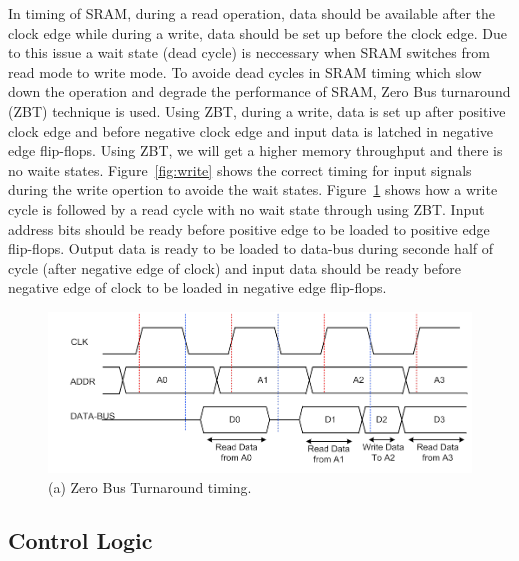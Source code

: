 In timing of SRAM, during a read operation, data should be available after the clock edge while 
during a write, data should be set up before the clock edge. Due to this issue a wait state (dead cycle) is neccessary when SRAM switches 
from read mode to write mode. 
To avoide dead cycles in SRAM timing which slow down the operation and degrade the performance of SRAM, Zero Bus turnaround (ZBT) technique is used.
Using ZBT, during a write, data is set up after positive clock edge and before negative clock edge and input data is latched in negative edge flip-flops. 
Using ZBT, we will get a higher memory throughput and there is no waite states.
Figure~\ref{fig:write} shows the correct timing for input signals during the write opertion to avoide the wait states. 
Figure~\ref{fig:ZBT} shows how a write cycle is followed by a read cycle with no wait state through using ZBT.
Input address bits should be ready before positive edge to be loaded to positive edge flip-flops. Output data is ready to be loaded to data-bus during seconde half of cycle (after negative edge of clock) and 
input data should be ready before negative edge of clock to be loaded in negative edge  flip-flops.

\begin{figure}[h!]
\centering
\includegraphics[scale=0.9]{./figs/ZBT.pdf}
\caption{(a) Zero Bus Turnaround timing.}
\label{fig:ZBT}
\end{figure}


\subsection{Control Logic}
\label{sec:control}



